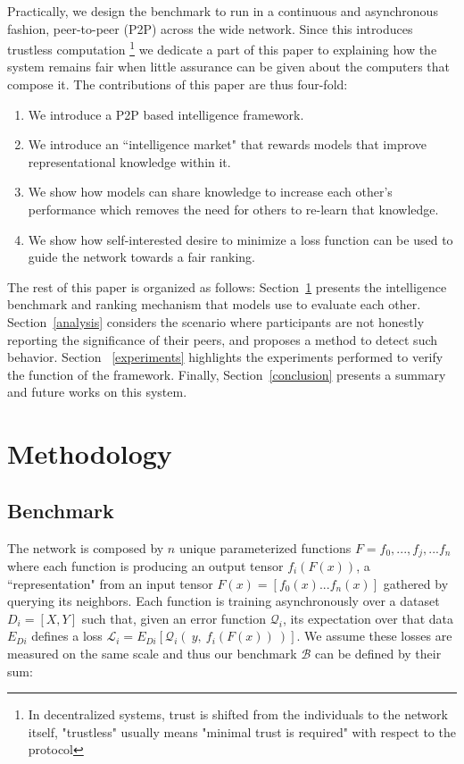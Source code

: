 \documentclass{article}
\begin{document}
Practically, we design the benchmark to run in a continuous and asynchronous fashion, peer-to-peer (P2P) across the wide network. Since this introduces trustless computation \footnote{ In decentralized systems, trust is shifted from the individuals to the network itself, "trustless" usually means "minimal trust is required" with respect to the protocol} we dedicate a part of this paper to explaining how the system remains fair when little assurance can be given about the computers that compose it. The contributions of this paper are thus four-fold:
\begin{enumerate}
	\item We introduce a P2P based intelligence framework.
	\item We introduce an ``intelligence market" that rewards models that improve representational knowledge within it.
	\item We show how models can share knowledge to increase each other's performance which removes the need for others to re-learn that knowledge. 
	\item We show how self-interested desire to minimize a loss function can be used to guide the network towards a fair ranking.
\end{enumerate}

The rest of this paper is organized as follows: Section~\ref{methodology} presents the intelligence benchmark and ranking mechanism that models use to evaluate each other. Section~\ref{analysis} considers the scenario where participants are not honestly reporting the significance of their peers, and proposes a method to detect such behavior. Section ~\ref{experiments} highlights the experiments performed to verify the function of the framework. Finally, Section~\ref{conclusion} presents a summary and future works on this system.

\section{Methodology}
\label{methodology}

\subsection{Benchmark}

The network is composed by $n$ unique parameterized functions $F = {f_0, ...,  f_j, ...f_n}$ where each function is producing an output tensor $f_i(F(x))$, a ``representation" from an input tensor $F(x) = [f_0{(x)} ... f_n{(x)}]$ gathered by querying its neighbors. Each function is training asynchronously over a dataset $D_i=[X,Y]$ such that, given an error function $\mathcal{Q}_i$, its expectation over that data $E_{Di}$ defines a loss $\mathcal{L}_i = E_{Di}[\mathcal{Q}_i( \ y, \ f_i(F(x)) \ )]$. We assume these losses are measured on the same scale and thus our benchmark $\mathcal{B}$ can be defined by their sum:
\bigskip
\end{document}
